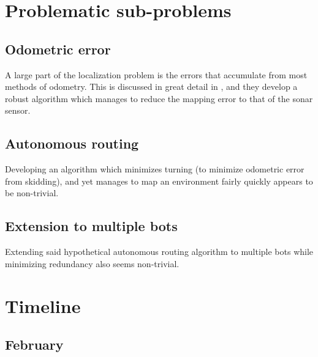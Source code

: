 \documentclass[12pt]{article}
\begin{document}
\section{Problematic sub-problems}
\subsection{Odometric error}
    
A large part of the localization problem is the errors that accumulate from most methods of odometry. This is discussed in great detail in \cite{tardos}, and they develop a robust algorithm which manages to reduce the mapping error to that of the sonar sensor. 

\subsection{Autonomous routing}

Developing an algorithm which minimizes turning (to minimize odometric error from skidding), and yet manages to map an environment fairly quickly appears to be non-trivial. 

\subsection{Extension to multiple bots}

Extending said hypothetical autonomous routing algorithm to multiple bots while minimizing redundancy also seems non-trivial.

\section{Timeline}

\subsection{February}
\end{document}
